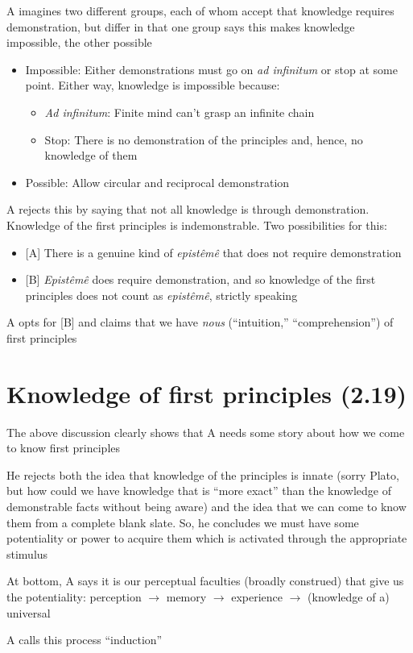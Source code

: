 \documentclass[11pt]{article}
\begin{document}
\noindent A imagines two different groups, each of whom accept that knowledge requires demonstration, but differ in that one group says this makes knowledge impossible, the other possible

\begin{itemize}\item{Impossible: Either demonstrations must go on \emph{ad infinitum} or stop at some point. Either way, knowledge is impossible because:}\begin{itemize}\item{\emph{Ad infinitum}: Finite mind can't grasp an infinite chain}\item{Stop: There is no demonstration of the principles and, hence, no knowledge of them}\end{itemize}\item{Possible: Allow circular and reciprocal demonstration}\end{itemize}

\noindent A rejects this by saying that not all knowledge is through demonstration. Knowledge of the first principles is indemonstrable. Two possibilities for this:

\begin{itemize}\item{[A] There is a genuine kind of \emph{epist\^{e}m\^{e}} that does not require demonstration}\item{[B] \emph{Epist\^{e}m\^{e}} does require demonstration, and so knowledge of the first principles does not count as \emph{epist\^{e}m\^{e}}, strictly speaking}\end{itemize}

\noindent A opts for [B] and claims that we have \emph{nous} (``intuition,'' ``comprehension'') of first principles

\section*{Knowledge of first principles (2.19)}

\noindent The above discussion clearly shows that A needs some story about how we come to know first principles
\vspace*{2mm}

\noindent He rejects both the idea that knowledge of the principles is innate (sorry Plato, but how could we have knowledge that is ``more exact'' than the knowledge of demonstrable facts without being aware) and the idea that we can come to know them from a complete blank slate. So, he concludes we must have some potentiality or power to acquire them which is activated through the appropriate stimulus
\vspace*{2mm}

\noindent At bottom, A says it is our perceptual faculties (broadly construed) that give us the potentiality: perception $\rightarrow$ memory $\rightarrow$ experience $\rightarrow$ (knowledge of a) universal
\vspace*{2mm}

\noindent A calls this process ``induction''
\end{document}
